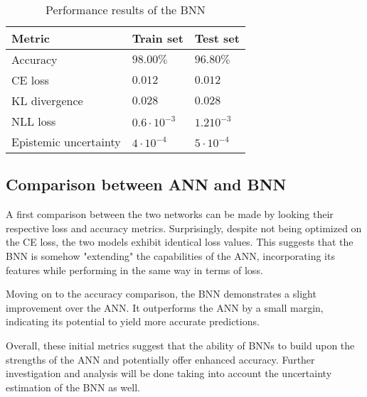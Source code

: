\begin{table}[h]
	\centering
	\begin{tabular}{|| l | l | l ||} 
		\hline
		\textbf{Metric} & \textbf{Train set} & \textbf{Test set}\\
		\hline
		\hline
		Accuracy & $98.00\%$ & $96.80\%$\\	
		CE loss & $0.012$ & $0.012$\\
		KL divergence & $0.028$ & $0.028$\\
		NLL loss & $0.6 \cdot 10^{-3}$ & $1.2 10^{-3}$\\
		Epistemic uncertainty & $4 \cdot 10^{-4}$ & $5 \cdot 10^{-4}$\\
		\hline
	\end{tabular}	
	\caption{Performance results of the BNN}
	\label{table:bnnper}
\end{table}

\subsection{Comparison between ANN and BNN}

A first comparison between the two networks can be made by looking their respective loss and accuracy metrics. Surprisingly, despite not being optimized on the CE loss, the two models exhibit identical loss values. This suggests that the BNN is somehow "extending" the capabilities of the ANN, incorporating its features while performing in the same way in terms of loss.

Moving on to the accuracy comparison, the BNN demonstrates a slight improvement over the ANN. It outperforms the ANN by a small margin, indicating its potential to yield more accurate predictions.

Overall, these initial metrics suggest that the ability of BNNs to build upon the strengths of the ANN and potentially offer enhanced accuracy. Further investigation and analysis will be done taking into account the uncertainty estimation of the BNN as well.